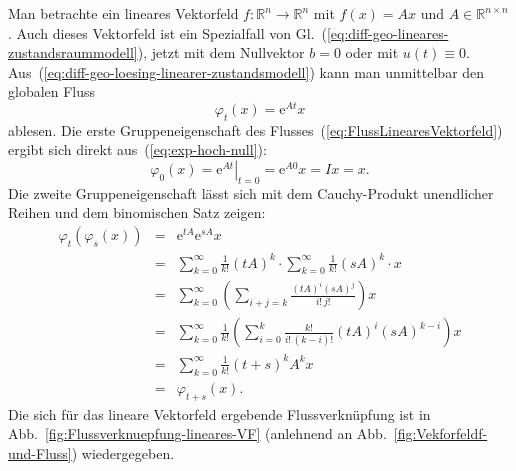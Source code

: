 \begin{example}
\label{exa:lineares-Vektorfeld-Gruppeneig}Man
betrachte ein lineares Vektorfeld $f:{\mathbb{R}}^{n}\to{\mathbb{R}}^{n}$ mit $f(x)=Ax$
und $A\in{\mathbb{R}}^{n\times n}$. Auch dieses Vektorfeld ist ein Spezialfall
von Gl.~(\ref{eq:diff-geo-lineares-zustandsraummodell}), jetzt mit
dem Nullvektor $b=0$ oder mit $u(t)\equiv0$. Aus~(\ref{eq:diff-geo-loesing-linearer-zustandsmodell})
kann man unmittelbar den globalen Fluss
\begin{equation}
\varphi_{t}(x)={\mathrm{e}}^{At}x\label{eq:FlussLinearesVektorfeld}
\end{equation}
ablesen. Die erste Gruppeneigenschaft des
Flusses~(\ref{eq:FlussLinearesVektorfeld}) ergibt sich direkt aus~(\ref{eq:exp-hoch-null}):
\[
\varphi_{0}(x)=\left.{\mathrm{e}}^{At}\right|_{t=0}={\mathrm{e}}^{A0}x=Ix=x.
\]
Die zweite Gruppeneigenschaft lässt sich
mit dem Cauchy-Produkt unendlicher Reihen und dem binomischen Satz
zeigen:
\[
\begin{array}{ccl}
\varphi_{t}(\varphi_{s}(x)) & = & {\mathrm{e}}^{tA}{\mathrm{e}}^{sA}x\\
 & = & \sum\limits _{k=0}^{\infty}\frac{1}{k!}(tA)^{k}\cdot\sum\limits _{k=0}^{\infty}\frac{1}{k!}(sA)^{k}\cdot x\\
 & = & \sum\limits _{k=0}^{\infty}\left(\sum\limits _{i+j=k}\frac{(tA)^{i}(sA)^{j}}{i!\,j!}\right)x\\
 & = & \sum\limits _{k=0}^{\infty}\frac{1}{k!}\left(\sum\limits _{i=0}^{k}\frac{k!}{i!\,(k-i)!}(tA)^{i}(sA)^{k-i}\right)x\\
 & = & \sum\limits _{k=0}^{\infty}\frac{1}{k!}(t+s)^{k}A^{k}x\\
 & = & \varphi_{t+s}(x).
\end{array}
\]
Die sich für das lineare Vektorfeld ergebende Flussverknüpfung ist
in Abb.~\ref{fig:Flussverknuepfung-lineares-VF} (anlehnend an Abb.~\ref{fig:Vekforfeldf-und-Fluss})
wiedergegeben.
\end{example}


